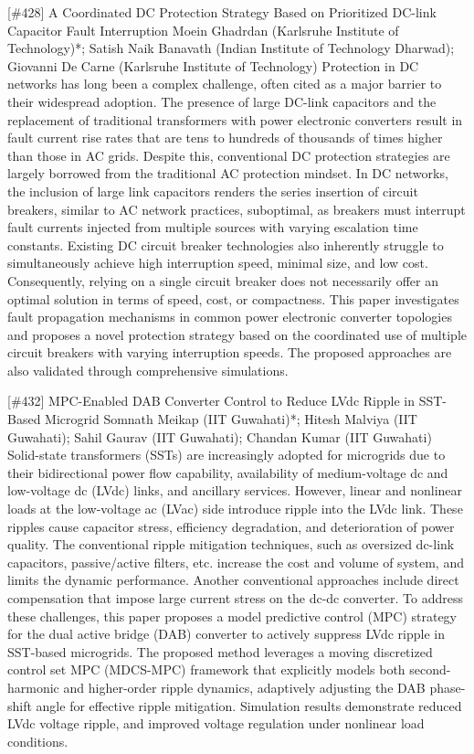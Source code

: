 {} \begin{abstract_online} {[\#428] A Coordinated DC Protection Strategy Based on Prioritized DC-link Capacitor Fault Interruption} {} {Moein Ghadrdan (Karlsruhe Institute of Technology)*; Satish  Naik Banavath (Indian Institute of Technology Dharwad); Giovanni De Carne (Karlsruhe Institute of Technology)} {} Protection in DC networks has long been a complex challenge, often cited as a major barrier to their widespread adoption. The presence of large DC-link capacitors and the replacement of traditional transformers with power electronic converters result in fault current rise rates that are tens to hundreds of thousands of times higher than those in AC grids. Despite this, conventional DC protection strategies are largely borrowed from the traditional AC protection mindset. In DC networks, the inclusion of large link capacitors renders the series insertion of circuit breakers, similar to AC network practices, suboptimal, as breakers must interrupt fault currents injected from multiple sources with varying escalation time constants. Existing DC circuit breaker technologies also inherently struggle to simultaneously achieve high interruption speed, minimal size, and low cost. Consequently, relying on a single circuit breaker does not necessarily offer an optimal solution in terms of speed, cost, or compactness. This paper investigates fault propagation mechanisms in common power electronic converter topologies and proposes a novel protection strategy based on the coordinated use of multiple circuit breakers with varying interruption speeds. The proposed approaches are also validated through comprehensive simulations. \end{abstract_online} 
{} \begin{abstract_online} {[\#432] MPC-Enabled DAB Converter Control to Reduce LVdc Ripple in SST-Based Microgrid} {} {Somnath Meikap (IIT Guwahati)*; Hitesh  Malviya (IIT Guwahati); Sahil Gaurav (IIT Guwahati); Chandan Kumar (IIT Guwahati)} {} Solid-state transformers (SSTs) are increasingly adopted for microgrids due to their bidirectional power flow capability, availability of medium-voltage dc and low-voltage dc (LVdc) links, and ancillary services. However, linear and nonlinear loads at the low-voltage ac (LVac) side introduce ripple into the LVdc link. These ripples cause capacitor stress, efficiency degradation, and deterioration of power quality. The conventional ripple mitigation techniques, such as oversized dc-link capacitors, passive/active filters, etc. increase the cost and volume of system, and limits the dynamic performance. Another conventional approaches include direct compensation that impose large current stress on the dc-dc converter. To address these challenges, this paper proposes a model predictive control (MPC) strategy for the dual active bridge (DAB) converter to actively suppress LVdc ripple in SST-based microgrids. The proposed method leverages a moving discretized control set MPC (MDCS-MPC) framework that explicitly models both second-harmonic and higher-order ripple dynamics, adaptively adjusting the DAB phase-shift angle for effective ripple mitigation. Simulation results demonstrate reduced LVdc voltage ripple, and improved voltage regulation under nonlinear load conditions. \end{abstract_online} 
